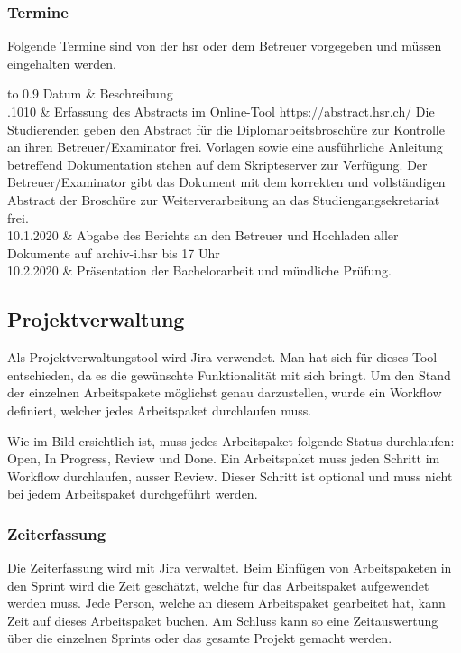 \subsubsection*{Termine}
Folgende Termine sind von der \gls{hsr} oder dem Betreuer vorgegeben und müssen eingehalten werden.

\begin{table}[h]
	\centering
	\begin{tabu} to 0.9\textwidth {l l X}
	\toprule
	Datum & Beschreibung \\ 
	.1010 & Erfassung des Abstracts im Online-Tool https://abstract.hsr.ch/ Die
Studierenden geben den Abstract für die Diplomarbeitsbroschüre zur
Kontrolle an ihren Betreuer/Examinator frei.
Vorlagen sowie eine ausführliche Anleitung betreffend Dokumentation
stehen auf dem Skripteserver zur Verfügung.
Der Betreuer/Examinator gibt das Dokument mit dem korrekten und
vollständigen Abstract der Broschüre zur Weiterverarbeitung an das
Studiengangsekretariat frei. \\
	10.1.2020 & Abgabe des Berichts an den Betreuer und Hochladen aller Dokumente auf archiv-i.hsr bis 17 Uhr \\
	10.2.2020 & Präsentation der Bachelorarbeit und mündliche Prüfung.
	\bottomrule
	\end{tabu}
\end{table}

\subsection{Projektverwaltung}
Als Projektverwaltungstool wird Jira verwendet. Man hat sich für dieses Tool entschieden, da es die gewünschte Funktionalität mit sich bringt. Um den Stand der einzelnen Arbeitspakete möglichst genau darzustellen, wurde ein Workflow definiert, welcher jedes Arbeitspaket durchlaufen muss.

Wie im Bild ersichtlich ist, muss jedes Arbeitspaket folgende Status durchlaufen: Open, In Progress, Review und Done. Ein Arbeitspaket muss jeden Schritt im Workflow durchlaufen, ausser Review. Dieser Schritt ist optional und muss nicht bei jedem Arbeitspaket durchgeführt werden.

\subsubsection*{Zeiterfassung}
Die Zeiterfassung wird mit Jira verwaltet. Beim Einfügen von Arbeitspaketen in den Sprint wird die Zeit geschätzt, welche für das Arbeitspaket aufgewendet werden muss. Jede Person, welche an diesem Arbeitspaket gearbeitet hat, kann Zeit auf dieses Arbeitspaket buchen. Am Schluss kann so eine Zeitauswertung über die einzelnen Sprints oder das gesamte Projekt gemacht werden.

